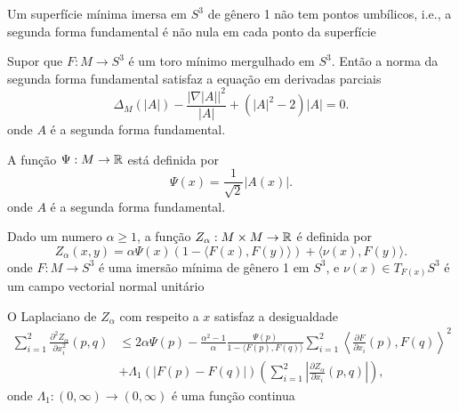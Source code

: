 \cite{Brendle2013}
\cite{Brendle2013a}

\begin{proposicao}
	Um superfície mínima imersa em $S^3$ de gênero 1 não tem pontos umbílicos, i.e., a segunda forma fundamental é não nula em cada ponto da superfície
\end{proposicao}

\begin{proposicao}
	Supor que $F: M \rightarrow S^3$ é um toro mínimo mergulhado em $S^3$. Então a norma da segunda forma fundamental satisfaz a equação em derivadas parciais
	\begin{equation*}
		\Delta_M (|A|) - \frac{| \nabla |A| |^2}{|A|} + (|A|^2 - 2) |A| = 0.
	\end{equation*}
	onde $A$ é a segunda forma fundamental.
\end{proposicao}

\begin{definicao}
	A função $\Psi: M \rightarrow \mathbb{R}$ está definida por
	\begin{equation*}
		\Psi(x) = \frac{1}{\sqrt{2}} |A(x)|.
	\end{equation*}
	onde $A$ é a segunda forma fundamental.
\end{definicao}

\begin{definicao}
	Dado um numero $\alpha \geq 1$, a função $Z_{\alpha}: M \times M \rightarrow \mathbb{R}$ é definida por
	\begin{equation*}
		Z_{\alpha}(x,y) = \alpha \Psi(x) (1 - \langle F(x), F(y) \rangle) + \langle \nu(x), F(y) \rangle.
	\end{equation*}
	onde $F: M \rightarrow S^3$ é uma imersão mínima de gênero 1 em $S^3$, e $\nu(x) \in T_{F(x)} S^3$ é um campo vectorial normal unitário
\end{definicao}

\begin{lema}
	O Laplaciano de $Z_{\alpha}$ com respeito a $x$ satisfaz a desigualdade
	\begin{equation*}
		\begin{split}
		\sum_{i=1}^{2} \frac{\partial^2 Z_{\alpha}}{\partial x_i^2} (p,q) & \leq 2 \alpha \Psi(p) - \frac{\alpha^2 - 1}{\alpha} \frac{\Psi(p)}{1 - \langle F(p), F(q) \rangle} \sum_{i=1}^{2} \left\langle \frac{\partial F}{\partial x_i} (p), F(q) \right\rangle^2\\
		& + \Lambda_1 (| F(p) - F(q) |) \left( \sum_{i=1}^{2} \left| \frac{\partial Z_{\alpha}}{\partial x_i} (p,q) \right| \right),
		\end{split}		
	\end{equation*}
	onde $\Lambda_1: (0,\infty) \rightarrow (0,\infty)$ é uma função continua
\end{lema}

